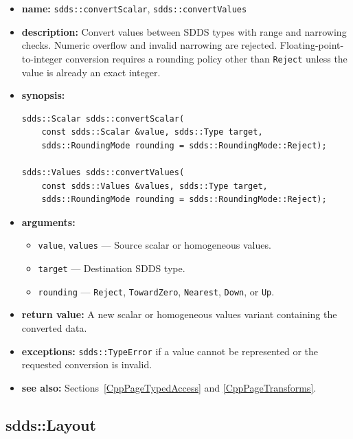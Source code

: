 \documentclass[11pt]{article}
\begin{document}
\begin{itemize}
\item {\bf name:}\newline
{\tt sdds::convertScalar}, {\tt sdds::convertValues}
\item {\bf description:}\newline
Convert values between SDDS types with range and narrowing checks.  Numeric
overflow and invalid narrowing are rejected.  Floating-point-to-integer
conversion requires a rounding policy other than {\tt Reject} unless the value
is already an exact integer.
\item {\bf synopsis:}
\begin{verbatim}
sdds::Scalar sdds::convertScalar(
    const sdds::Scalar &value, sdds::Type target,
    sdds::RoundingMode rounding = sdds::RoundingMode::Reject);

sdds::Values sdds::convertValues(
    const sdds::Values &values, sdds::Type target,
    sdds::RoundingMode rounding = sdds::RoundingMode::Reject);
\end{verbatim}
\item {\bf arguments:}
\begin{itemize}
\item {\tt value}, {\tt values} --- Source scalar or homogeneous values.
\item {\tt target} --- Destination SDDS type.
\item {\tt rounding} --- {\tt Reject}, {\tt TowardZero}, {\tt Nearest},
{\tt Down}, or {\tt Up}.
\end{itemize}
\item {\bf return value:}\newline
A new scalar or homogeneous values variant containing the converted data.
\item {\bf exceptions:}\newline
{\tt sdds::TypeError} if a value cannot be represented or the requested
conversion is invalid.
\item {\bf see also:}\newline
Sections~\ref{CppPageTypedAccess} and \ref{CppPageTransforms}.
\end{itemize}

\subsection{sdds::Layout}
\label{CppLayout}
\end{document}
